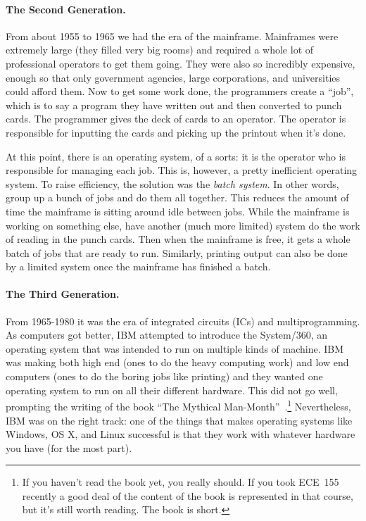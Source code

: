\paragraph{The Second Generation.} From about 1955 to 1965 we had the era of the mainframe. Mainframes were extremely large (they filled very big rooms) and required a whole lot of professional operators to get them going. They were also so incredibly expensive, enough so that only government agencies, large corporations, and universities could afford them. Now to get some work done, the programmers create a ``job'', which is to say a program they have written out and then converted to punch cards. The programmer gives the deck of cards to an operator. The operator is responsible for inputting the cards and picking up the printout when it's done. 

At this point, there is an operating system, of a sorts: it is the operator who is responsible for managing each job. This is, however, a pretty inefficient operating system. To raise efficiency, the solution was the \textit{batch system}. In other words, group up a bunch of jobs and do them all together. This reduces the amount of time the mainframe is sitting around idle between jobs. While the mainframe is working on something else, have another (much more limited) system do the work of reading in the punch cards. Then when the mainframe is free, it gets a whole batch of jobs that are ready to run. Similarly, printing output can also be done by a limited system once the mainframe has finished a batch. 


\paragraph{The Third Generation.} From 1965-1980 it was the era of integrated circuits (ICs) and multiprogramming. As computers got better, IBM attempted to introduce the System/360, an operating system that was intended to run on multiple kinds of machine. IBM was making both high end (ones to do the heavy computing work) and low end computers (ones to do the boring jobs like printing) and they wanted one operating system to run on all their different hardware. This did not go well, prompting the writing of the book ``The Mythical Man-Month''~\cite{mmm}.\footnote{If you haven't read the book yet, you really should. If you took ECE~155 recently a good deal of the content of the book is represented in that course, but it's still worth reading. The book is short.} Nevertheless, IBM was on the right track: one of the things that makes operating systems like Windows, OS X, and Linux successful is that they work with whatever hardware you have (for the most part). 

